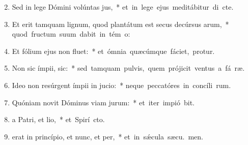 \begin{flushleft}
\begin{enumerate}[leftmargin=*]
\setcounter{enumi}{1}

\item Sed in lege Dómini volúntas jus,~* \mbox{et in lege ejus meditábitur di  cte.}

\item Et erit tamquam lignum, quod plantátum est secus decúrsus arum,~* \mbox{quod fructum suum dabit in tém o:}

\item Et fólium ejus non fluet:~* \mbox{et ómnia quæcúmque fáciet, protur.}

\item Non sic ímpii,  sic:~* \mbox{sed tamquam pulvis, quem prójicit ventus a fá ræ.}

\item Ideo non resúrgent ímpii in jucio:~* \mbox{neque peccatóres in concíli rum.}

\item Quóniam novit Dóminus viam jurum:~* \mbox{et iter impió bit.}
\item {}a Patri, et lio,~* \mbox{et Spirí cto.}
\item {} erat in princípio, et nunc, et per,~* \mbox{et in s\'{\ae}cula sæcu. men.}


\end{enumerate}
\end{flushleft}

